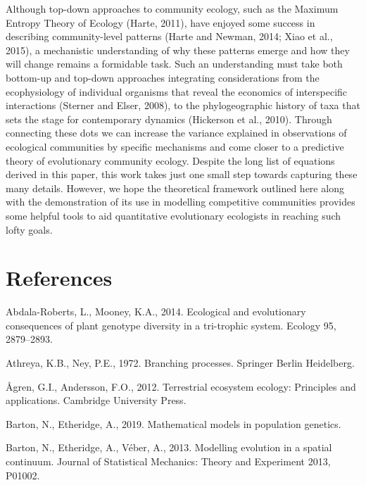 \documentclass[]{elsarticle} %
\begin{document}
Although top-down approaches to community ecology, such as the Maximum
Entropy Theory of Ecology (Harte, 2011), have enjoyed some success in
describing community-level patterns (Harte and Newman, 2014; Xiao et
al., 2015), a mechanistic understanding of why these patterns emerge and
how they will change remains a formidable task. Such an understanding
must take both bottom-up and top-down approaches integrating
considerations from the ecophysiology of individual organisms that
reveal the economics of interspecific interactions (Sterner and Elser,
2008), to the phylogeographic history of taxa that sets the stage for
contemporary dynamics (Hickerson et al., 2010). Through connecting these
dots we can increase the variance explained in observations of
ecological communities by specific mechanisms and come closer to a
predictive theory of evolutionary community ecology. Despite the long
list of equations derived in this paper, this work takes just one small
step towards capturing these many details. However, we hope the
theoretical framework outlined here along with the demonstration of its
use in modelling competitive communities provides some helpful tools to
aid quantitative evolutionary ecologists in reaching such lofty goals.

\newpage

\hypertarget{references}{%
\section*{References}\label{references}}

\hypertarget{refs}{}
\leavevmode\hypertarget{ref-AbdalaRoberts2014}{}%
Abdala-Roberts, L., Mooney, K.A., 2014. Ecological and evolutionary
consequences of plant genotype diversity in a tri-trophic system.
Ecology 95, 2879--2893.

\leavevmode\hypertarget{ref-Athreya1972}{}%
Athreya, K.B., Ney, P.E., 1972. Branching processes. Springer Berlin
Heidelberg.

\leavevmode\hypertarget{ref-9781107648258}{}%
Ågren, G.I., Andersson, F.O., 2012. Terrestrial ecosystem ecology:
Principles and applications. Cambridge University Press.

\leavevmode\hypertarget{ref-Barton2019}{}%
Barton, N., Etheridge, A., 2019. Mathematical models in population
genetics.

\leavevmode\hypertarget{ref-Barton2013}{}%
Barton, N., Etheridge, A., Véber, A., 2013. Modelling evolution in a
spatial continuum. Journal of Statistical Mechanics: Theory and
Experiment 2013, P01002.
\end{document}

